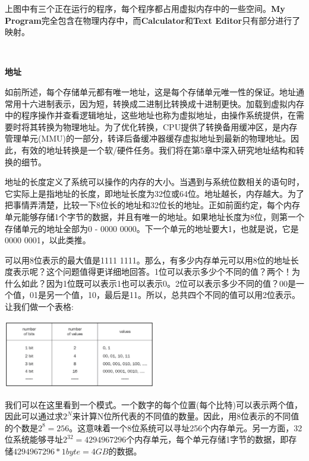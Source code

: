 上图中有三个正在运行的程序，每个程序都占用虚拟内存中的一些空间。\textbf{My Program}完全包含在物理内存中，而\textbf{Calculator}和\textbf{Text Editor}只有部分进行了映射。 \par

\noindent\textbf{}\ \par
\textbf{地址} \ \par
如前所述，每个存储单元都有唯一地址，这是每个存储单元唯一性的保证。地址通常用十六进制表示，因为短，转换成二进制比转换成十进制更快。加载到虚拟内存中的程序操作并查看逻辑地址，这些地址也称为虚拟地址，由操作系统提供，在需要时将其转换为物理地址。为了优化转换，CPU提供了转换备用缓冲区，是内存管理单元(MMU)的一部分，转译后备缓冲器缓存虚拟地址到最新的物理地址。因此，有效的地址转换是一个软/硬件任务。我们将在第5章中深入研究地址结构和转换的细节。 \par
地址的长度定义了系统可以操作的内存的大小。当遇到与系统位数相关的语句时，它实际上是指地址的长度，即地址长度为32位或64位。地址越长，内存越大。为了把事情弄清楚，比较一下8位长的地址和32位长的地址。正如前面约定，每个内存单元能够存储1个字节的数据，并且有唯一的地址。如果地址长度为8位，则第一个存储单元的地址全部为0 - 0000 0000。下一个单元的地址要大1，也就是说，它是0000 0001，以此类推。 \par
可以用8位表示的最大值是1111 1111。那么，有多少内存单元可以用8位的地址长度表示呢？这个问题值得更详细地回答。1位可以表示多少个不同的值？两个！为什么如此？因为1位既可以表示1也可以表示0。2位可以表示多少不同的值？00是一个值，01是另一个值，10，最后是11。所以，总共四个不同的值可以用2位表示。让我们做一个表格: \par

\begin{center}
	\includegraphics[width=0.5\textwidth]{content/Section-1/Chapter-2/8}
\end{center}

我们可以在这里看到一个模式。一个数字的每个位置(每个比特)可以表示两个值，因此可以通过求$2^N$来计算N位所代表的不同值的数量。因此，用8位表示的不同值的个数是$2^8 = 256$。这意味着一个8位系统可以寻址256个内存单元。另一方面，32位系统能够寻址$2^{32} = 4294967296$个内存单元，每个单元存储1字节的数据，即存储$4294967296 * 1byte= 4GB$的数据。

